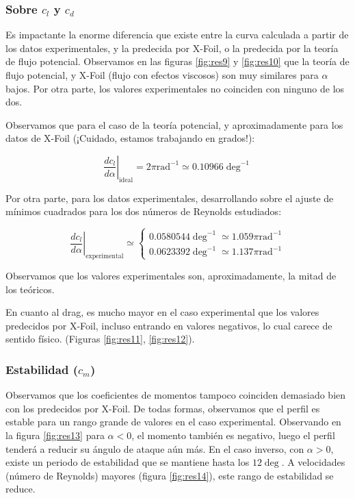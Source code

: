 \documentclass{article}
\begin{document}
\subsubsection{Sobre \texorpdfstring{$c_{l}$}{lift} y \texorpdfstring{$c_d$}{drag}}

\label{discus}

Es impactante la enorme diferencia que existe entre la curva calculada a partir de los datos experimentales, 
y la predecida por X-Foil, o la predecida por la teoría de flujo potencial. Observamos en las figuras \ref{fig:res9} y 
\ref{fig:res10} que la teoría de flujo potencial, y X-Foil (flujo con efectos viscosos) son muy similares 
para $\alpha$ bajos. Por otra parte, los valores experimentales no coinciden con ninguno de los dos.

Observamos que para el caso de la teoría potencial, y aproximadamente para los datos de X-Foil (¡Cuidado, estamos trabajando
en grados!):

$$\left. \frac{dc_l}{d\alpha} \right\rvert_{\text{ideal}} = 2\pi \text{rad}^{-1} \simeq 0.10966 \deg^{-1}$$

Por otra parte, para los datos experimentales, desarrollando sobre el ajuste de mínimos cuadrados para los dos números de Reynolds estudiados:

$$\left. \frac{dc_l}{d\alpha} \right\rvert_{\text{experimental}}  \simeq \begin{cases}
    0.0580544 \deg^{-1} \simeq 1.059\pi \text{rad}^{-1} \\
    0.0623392 \deg^{-1} \simeq 1.137\pi \text{rad}^{-1}
\end{cases}
$$

Observamos que los valores experimentales son, aproximadamente, la mitad de los teóricos.

En cuanto al drag, es mucho mayor en el caso experimental que los valores predecidos por X-Foil, incluso entrando
en valores negativos, lo cual carece de sentido físico. (Figuras \ref{fig:res11},  \ref{fig:res12}).

\subsubsection{Estabilidad (\texorpdfstring{$c_{m}$}{momentos})}

Observamos que los coeficientes de momentos tampoco coinciden demasiado bien con los predecidos por X-Foil. De todas formas, 
observamos que el perfil es estable para un rango grande de valores en el caso experimental. Observando en la figura \ref{fig:res13}
para $\alpha < 0$, el momento también es negativo, luego el perfil tenderá a reducir su ángulo de ataque aún más.
En el caso inverso, con $\alpha > 0$, existe un periodo de estabilidad que se mantiene hasta los $12\deg$. A velocidades 
(número de Reynolds) mayores (figura \ref{fig:res14}), este rango de estabilidad se reduce.
\end{document}
